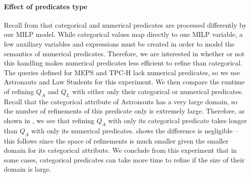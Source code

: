 \paragraph*{Effect of predicates type}
Recall from  that categorical and numerical predicates are processed differently by our MILP model. While categorical values map directly to one MILP variable, a few auxiliary variables and expressions must be created in order to model the semantics of numerical predicates. Therefore, we are interested in whether or not this handling makes numerical predicates less efficient to refine than categorical. The queries defined for MEPS and TPC-H lack numerical predicates, so we use Astronauts and Law Students for this experiment. We then compare the runtime of refining $Q_A$ and $Q_L$ with either only their categorical or numerical predicates. Recall that the categorical attribute of Astronauts has a very large domain, so the number of refinements of this predicate only is extremely large. Therefore, as shown in , we see that refining $Q_A$ with only its categorical predicate takes longer than $Q_A$ with only its numerical predicates.  shows the difference is negligible -- this follows since the space of refinements is much smaller given the smaller domain for its categorical attribute. We conclude from this experiment that in some cases, categorical predicates can take more time to refine if the size of their domain is large.
\fi


